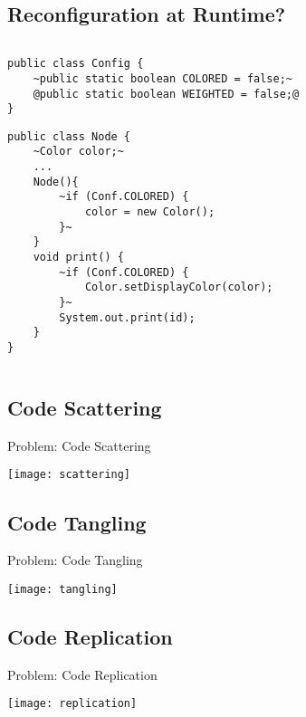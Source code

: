\subsection{Reconfiguration at Runtime?}
\begin{frame}[fragile]{\insertsubsection}
		\begin{columns}
\begin{tiny}
\begin{lstlisting}
public class Config {
	~public static boolean COLORED = false;~
	@public static boolean WEIGHTED = false;@
}

\end{lstlisting}
\begin{lstlisting}
public class Node {
	~Color color;~
	...
	Node(){
		~if (Conf.COLORED) { 
			color = new Color(); 
		}~
	}
	void print() {
		~if (Conf.COLORED) { 
			Color.setDisplayColor(color); 
		}~
		System.out.print(id);
	}
}
\end{lstlisting}
\end{tiny}	
		\end{columns}
\end{frame}

\subsection{Code Scattering}
\begin{frame}{Problem: Code Scattering}
	\begin{center}
		\vspace{-2mm}
		\texttt{[image: scattering]}
	\end{center}
\end{frame}

\subsection{Code Tangling}
\begin{frame}{Problem: Code Tangling}
	\begin{center}
		\vspace{-2mm}
		\texttt{[image: tangling]}
	\end{center}
\end{frame}

\subsection{Code Replication}
\begin{frame}{Problem: Code Replication}
	\begin{center}
		\vspace{-2mm}
		\texttt{[image: replication]}
	\end{center}
\end{frame}